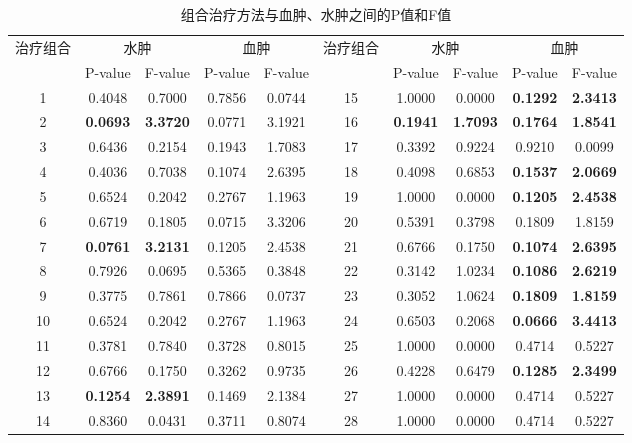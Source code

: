 \documentclass[bwprint]{gmcmthesis}
\begin{document}
\begin{table}[h]  %
	\centering     %
	\caption{组合治疗方法与血肿、水肿之间的P值和F值}  %
	\label{组合治疗方法与血肿、水肿之间的P值和F值}        %
	\begin{tabular}{ c c c c c ccccc}  %
		\toprule[1.5pt]   %
		
		\multirow{2}{1cm}{治疗组合} & \multicolumn{2}{c}{水肿} & \multicolumn{2}{c}{血肿}&\multirow{2}{1cm}{治疗组合} & \multicolumn{2}{c}{水肿} & \multicolumn{2}{c}{血肿}  \\ 
		&P-value    & F-value  & P-value    & F-value&	&P-value    & F-value  & P-value    & F-value   \\ 
		
		\midrule[1pt]     %
		
        1 & 0.4048  & 0.7000  & 0.7856  & 0.0744& 15 & 1.0000  & 0.0000  & \textbf{0.1292}  & \textbf{2.3413}  \\
        2 & \textbf{0.0693}  & \textbf{3.3720}  & 0.0771  & 3.1921&  16 & \textbf{0.1941}  & \textbf{1.7093}  & \textbf{0.1764}  & \textbf{1.8541}  \\
        3 & 0.6436  & 0.2154  & 0.1943  & 1.7083&  17 & 0.3392  & 0.9224  & 0.9210  & 0.0099  \\
        4 & 0.4036  & 0.7038  & 0.1074  & 2.6395&  18 & 0.4098  & 0.6853  & \textbf{0.1537 } & \textbf{2.0669}  \\
        5 & 0.6524  & 0.2042  & 0.2767  & 1.1963&  19 & 1.0000  & 0.0000  & \textbf{0.1205}  & \textbf{2.4538}  \\
        6 & 0.6719  & 0.1805  & 0.0715  & 3.3206&   20 & 0.5391  & 0.3798  & 0.1809  & 1.8159  \\
        7 & \textbf{0.0761}  & \textbf{3.2131}  & 0.1205  & 2.4538&  21 & 0.6766  & 0.1750  & \textbf{0.1074}  & \textbf{2.6395}  \\
        8 & 0.7926  & 0.0695  & 0.5365  & 0.3848& 22 & 0.3142  & 1.0234  & \textbf{0.1086}  & \textbf{2.6219}  \\
        9 & 0.3775  & 0.7861  & 0.7866  & 0.0737&  23 & 0.3052  & 1.0624  & \textbf{0.1809}  &\textbf{ 1.8159}  \\
        10 & 0.6524  & 0.2042  & 0.2767  & 1.1963& 24 & 0.6503  & 0.2068  & \textbf{0.0666}  & \textbf{3.4413}  \\
        11 & 0.3781  & 0.7840  & 0.3728  & 0.8015&  25 & 1.0000  & 0.0000  & 0.4714  & 0.5227  \\
        12 & 0.6766  & 0.1750  & 0.3262  & 0.9735& 26 & 0.4228  & 0.6479  & \textbf{0.1285}  & \textbf{2.3499}  \\
        13 & \textbf{0.1254}  & \textbf{2.3891}  & 0.1469  & 2.1384&  27 & 1.0000  & 0.0000  & 0.4714  & 0.5227  \\
        14 & 0.8360  & 0.0431  & 0.3711  & 0.8074&  28 & 1.0000  & 0.0000  & 0.4714  & 0.5227 \\
		\bottomrule[1.5pt]   %
	\end{tabular} 
\end{table}
\end{document}
